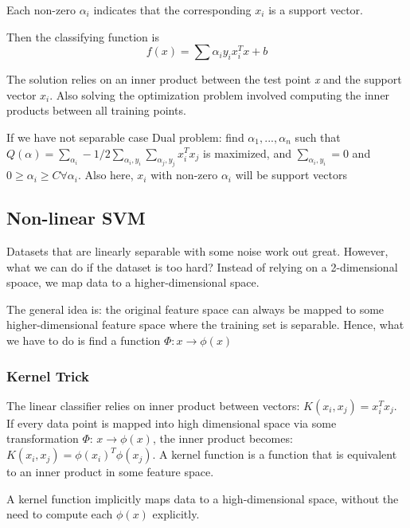 \documentclass{article}
\begin{document}
Each non-zero $\alpha_i$ indicates that the corresponding \(x_i\) is a support vector.

Then the classifying function is \[f(x) = \sum \alpha_i y_i x_i^Tx+b\]

The solution relies on an inner product between the test point \emph{x} and the support vector \(x_i\). Also solving the optimization problem involved computing the inner products between all training points.


If we have not separable case Dual problem: find \(\alpha_1, ..., \alpha_n\) such that \(Q(\alpha) = \sum_{\alpha_i} - 1/2 \sum_{\alpha_i, y_i} \sum_{\alpha_j, y_j} x_i^Tx_j\) is maximized, and \(\sum_{\alpha_i, y_i} = 0\) and \(0 \geq \alpha_i \geq C \forall \alpha_i\). Also here, \(x_i\) with non-zero $\alpha_i$ will be support vectors


\bigskip



\subsection*{Non-linear SVM}
Datasets that are linearly separable with some noise work out great. However, what we can do if the dataset is too hard? Instead of relying on a 2-dimensional spoace, we map data to a higher-dimensional space.

The general idea is: the original feature space can always be mapped to some higher-dimensional feature space where the training set is separable. Hence, what we have to do is find a function \(\Phi: x \rightarrow \phi(x)\)

\subsubsection*{Kernel Trick}
The linear classifier relies on inner product between vectors: \(K(x_i, x_j) = x_i^Tx_j\). If every data point is mapped into high dimensional space via some transformation $\Phi$: \(x \rightarrow \phi(x)\), the inner product becomes:  \(K(x_i, x_j) = \phi(x_i)^T\phi(x_j)\). A kernel function is a function that is equivalent to an inner product in some feature space.

A kernel function implicitly maps data to a high-dimensional space, without the need to compute each \(\phi(x)\) explicitly.
\end{document}
